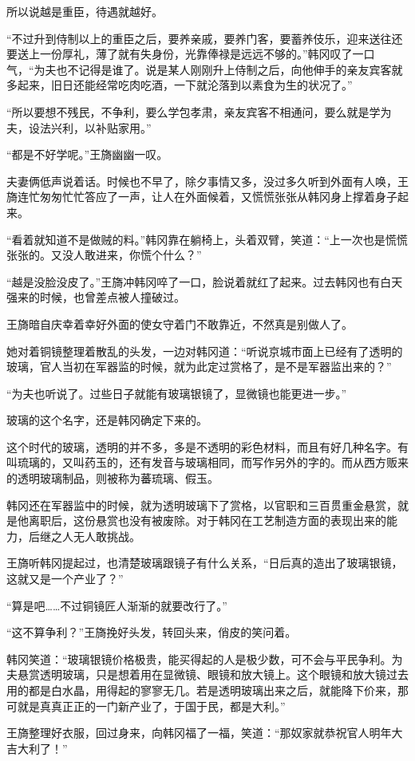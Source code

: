 所以说越是重臣，待遇就越好。

“不过升到侍制以上的重臣之后，要养亲戚，要养门客，要蓄养伎乐，迎来送往还要送上一份厚礼，薄了就有失身份，光靠俸禄是远远不够的。”韩冈叹了一口气，“为夫也不记得是谁了。说是某人刚刚升上侍制之后，向他伸手的亲友宾客就多起来，旧日还能经常吃肉吃酒，一下就沦落到以素食为生的状况了。”

“所以要想不残民，不争利，要么学包孝肃，亲友宾客不相通问，要么就是学为夫，设法兴利，以补贴家用。”

“都是不好学呢。”王旖幽幽一叹。

夫妻俩低声说着话。时候也不早了，除夕事情又多，没过多久听到外面有人唤，王旖连忙匆匆忙忙答应了一声，让人在外面候着，又慌慌张张从韩冈身上撑着身子起来。

“看着就知道不是做贼的料。”韩冈靠在躺椅上，头着双臂，笑道：“上一次也是慌慌张张的。又没人敢进来，你慌个什么？”

“越是没脸没皮了。”王旖冲韩冈啐了一口，脸说着就红了起来。过去韩冈也有白天强来的时候，也曾差点被人撞破过。

王旖暗自庆幸着幸好外面的使女守着门不敢靠近，不然真是别做人了。

她对着铜镜整理着散乱的头发，一边对韩冈道：“听说京城市面上已经有了透明的玻璃，官人当初在军器监的时候，就为此定过赏格了，是不是军器监出来的？”

“为夫也听说了。过些日子就能有玻璃银镜了，显微镜也能更进一步。”

玻璃的这个名字，还是韩冈确定下来的。

这个时代的玻璃，透明的并不多，多是不透明的彩色材料，而且有好几种名字。有叫琉璃的，又叫药玉的，还有发音与玻璃相同，而写作另外的字的。而从西方贩来的透明玻璃制品，则被称为蕃琉璃、假玉。

韩冈还在军器监中的时候，就为透明玻璃下了赏格，以官职和三百贯重金悬赏，就是他离职后，这份悬赏也没有被废除。对于韩冈在工艺制造方面的表现出来的能力，后继之人无人敢挑战。

王旖听韩冈提起过，也清楚玻璃跟镜子有什么关系，“日后真的造出了玻璃银镜，这就又是一个产业了？”

“算是吧……不过铜镜匠人渐渐的就要改行了。”

“这不算争利？”王旖挽好头发，转回头来，俏皮的笑问着。

韩冈笑道：“玻璃银镜价格极贵，能买得起的人是极少数，可不会与平民争利。为夫悬赏透明玻璃，只是想着用在显微镜、眼镜和放大镜上。这个眼镜和放大镜过去用的都是白水晶，用得起的寥寥无几。若是透明玻璃出来之后，就能降下价来，那可就是真真正正的一门新产业了，于国于民，都是大利。”

王旖整理好衣服，回过身来，向韩冈福了一福，笑道：“那奴家就恭祝官人明年大吉大利了！”

